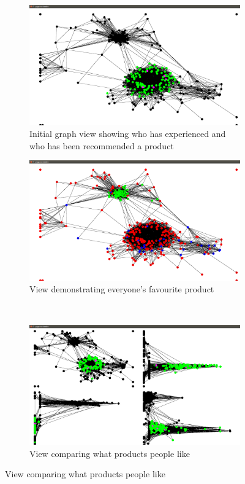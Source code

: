\documentclass[12pt,a4paper]{article}
\begin{document}
\begin{figure}[htb]
\centering
\captionsetup[subfigure]{justification=centering}
	\begin{subfigure}[c]{0.4\linewidth}
	\caption{Initial graph view showing who has experienced and who has been recommended a product}
	\label{fig:recommendationInitial}
	\includegraphics[scale=0.1]{Recommendation1.png}
	\end{subfigure}
\quad
	\begin{subfigure}[c]{0.4\linewidth}
	\caption{View demonstrating everyone's favourite product}
	\label{fig:recommendationFavourite}
	\includegraphics[scale=0.1]{Recommendation2.png}
	\end{subfigure}
\\	
	\begin{subfigure}[c]{0.4\linewidth}
	\caption{View comparing what products people like}
	\label{fig:recommendationComparison}
	\includegraphics[scale=0.1]{Recommendation3.png}

\end{subfigure}
\end{figure}
\end{document}
